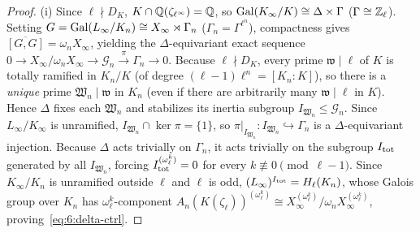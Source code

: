 \begin{theorem}
\begin{enumerate}[label=\textup{(\roman*)}]
\end{enumerate}
\end{theorem}
\begin{proof}
(i) Since $\ell \nmid D_K$, $K \cap \mathbb{Q}(\zeta_{\ell^\infty}) = \mathbb{Q}$, so $\mathrm{Gal}(K_\infty/K) \cong \Delta \times \Gamma$ ($\Gamma \cong \mathbb{Z}_\ell$). Setting $G = \mathrm{Gal}(L_\infty/K_n) \cong X_\infty \rtimes \Gamma_n$ ($\Gamma_n = \Gamma^{\ell^n}$), compactness gives $\overline{[G,G]} = \omega_n X_\infty$, yielding the $\Delta$-equivariant exact sequence $0 \to X_\infty/\omega_n X_\infty \to \mathcal{G}_n \xrightarrow{\pi} \Gamma_n \to 0$. Because $\ell \nmid D_K$, every prime $\mathfrak{w} \mid \ell$ of $K$ is totally ramified in $K_n/K$ (of degree $(\ell-1)\ell^n = [K_n:K]$), so there is a \emph{unique} prime $\mathfrak{W}_n \mid \mathfrak{w}$ in $K_n$ (even if there are arbitrarily many $\mathfrak{w} \mid \ell$ in $K$). Hence $\Delta$ fixes each $\mathfrak{W}_n$ and stabilizes its inertia subgroup $I_{\mathfrak{W}_n} \le \mathcal{G}_n$. Since $L_\infty/K_\infty$ is unramified, $I_{\mathfrak{W}_n} \cap \ker\pi = \{1\}$, so $\pi|_{I_{\mathfrak{W}_n}} : I_{\mathfrak{W}_n} \hookrightarrow \Gamma_n$ is a $\Delta$-equivariant injection. Because $\Delta$ acts trivially on $\Gamma_n$, it acts trivially on the subgroup $I_{\mathrm{tot}}$ generated by all $I_{\mathfrak{W}_n}$, forcing $I_{\mathrm{tot}}^{(\omega_\ell^k)} = 0$ for every $k \not\equiv 0 \pmod{\ell-1}$. Since $K_\infty/K_n$ is unramified outside $\ell$ and $\ell$ is odd, $(L_\infty)^{I_{\mathrm{tot}}} = H_\ell(K_n)$, whose Galois group over $K_n$ has $\omega_\ell^k$-component $A_n(K(\zeta_\ell))^{(\omega_\ell^k)} \cong X_\infty^{(\omega_\ell^k)}/\omega_n X_\infty^{(\omega_\ell^k)}$, proving~\eqref{eq:6:delta-ctrl}.


\end{proof}
